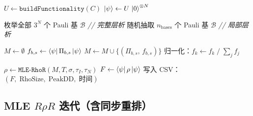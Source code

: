 \documentclass[12pt, a4paper]{article}
\begin{document}
\begin{algorithm}[H]
\caption{QST-QMDD：量子态层析主流程}
\begin{algorithmic}[1]

\State $U \leftarrow \texttt{buildFunctionality}(C)$
\State $\ket{\psi} \leftarrow U\,\ket{0}^{\otimes N}$

    \State 枚举全部 $3^N$ 个 Pauli 基 $\mathcal{B}$
    \quad\textit{// 完整层析}
\Else
    \State 随机抽取 $n_{\mathrm{bases}}$ 个 Pauli 基 $\mathcal{B}$
    \quad\textit{// 局部层析}
\EndIf

\State $M \leftarrow \emptyset$
    \State $f_{b,s} \leftarrow \bra{\psi}\Pi_{b,s}\ket{\psi}$
        \State $M \leftarrow M \cup \{(\Pi_{b,s},\, f_{b,s})\}$
    \EndIf
\EndFor
\State 归一化：$f_k \leftarrow f_k \;/\; \sum_j f_j$

    \State $\rho \leftarrow \texttt{MLE-RhoR}(M, T, \sigma, \tau_I, \tau_N)$
    \State $F \leftarrow \bra{\psi}\rho\ket{\psi}$
    \State 写入 CSV：$(F,\; \text{RhoSize},\; \text{PeakDD},\; \text{时间})$
\EndFor
\end{algorithmic}
\end{algorithm}

\subsection{\texorpdfstring{MLE $R\rho R$ 迭代（含同步重排）}{MLE RρR 迭代（含同步重排）}}
\end{document}
